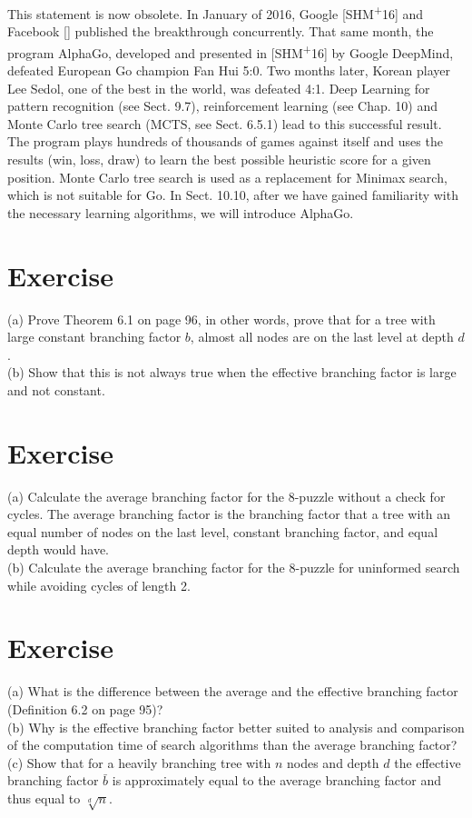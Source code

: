 \documentclass[10pt]{book}
\begin{document}
This statement is now obsolete. In January of 2016, Google [SHM\textsuperscript{+}16] and Facebook [\cite{tz16}] published the breakthrough concurrently. That same month, the program AlphaGo, developed and presented in [SHM\textsuperscript{+}16] by Google DeepMind, defeated European Go champion Fan Hui 5:0. Two months later, Korean player Lee Sedol, one of the best in the world, was defeated 4:1. Deep Learning for pattern recognition (see Sect. 9.7), reinforcement learning (see Chap. 10) and Monte Carlo tree search (MCTS, see Sect. 6.5.1) lead to this successful result.
The program plays hundreds of thousands of games against itself and uses the results (win, loss, draw) to learn the best possible heuristic score for a given position. Monte Carlo tree search is used as a replacement for Minimax search, which is not suitable for Go. In Sect. 10.10, after we have gained familiarity with the necessary learning algorithms, we will introduce AlphaGo.

\section{Exercise}
(a) Prove Theorem 6.1 on page 96, in other words, prove that for a tree with large constant branching factor $b$, almost all nodes are on the last level at depth $d$.\\
(b) Show that this is not always true when the effective branching factor is large and not constant.

\section{Exercise}
(a) Calculate the average branching factor for the 8-puzzle without a check for cycles. The average branching factor is the branching factor that a tree with an equal number of nodes on the last level, constant branching factor, and equal depth would have.\\
(b) Calculate the average branching factor for the 8-puzzle for uninformed search while avoiding cycles of length 2.

\section{Exercise}
(a) What is the difference between the average and the effective branching factor (Definition 6.2 on page 95)?\\
(b) Why is the effective branching factor better suited to analysis and comparison of the computation time of search algorithms than the average branching factor?\\
(c) Show that for a heavily branching tree with $n$ nodes and depth $d$ the effective branching factor $\bar{b}$ is approximately equal to the average branching factor and thus equal to $\sqrt[d]{n}$.
\end{document}
